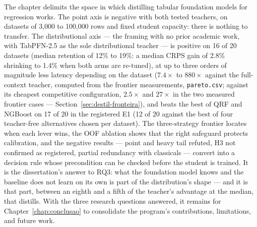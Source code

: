 The chapter delimits the space in which distilling tabular
foundation models for regression works. The point axis is negative
with both tested teachers, on datasets of 3{,}000 to 100{,}000 rows
and fixed student capacity: there is nothing to transfer. The
distributional axis --- the framing with no prior academic work,
with TabPFN-2.5 as the sole distributional teacher --- is positive
on 16 of 20 datasets (median retention of 12\% to 19\%: a median
CRPS gain of 2.8\% shrinking to 1.4\% when both arms are re-tuned),
at up to three orders of
magnitude less latency depending on the dataset ($7.4\times$ to
$880\times$ against the full-context teacher, computed from the
frontier measurements, \texttt{pareto.csv}; against its cheapest
competitive configuration, $2.5\times$ and $27\times$ in the two
measured frontier cases ---
Section~\ref{sec:destil-fronteira}), and
beats the best of QRF and NGBoost on 17 of 20 in the registered
E1 (12 of 20 against the best of four teacher-free alternatives
chosen per dataset).
The three-strategy frontier locates when each lever wins, the OOF
ablation shows that the right safeguard protects calibration, and
the negative results --- point and heavy tail refuted, H3 not
confirmed as registered,
partial redundancy with classicals --- convert into a decision rule
whose precondition can be checked before the student is trained.
It is the
dissertation's answer to RQ3: what the foundation model knows and
the baseline does not learn on its own is part of the
distribution's shape --- and it is that part, between an eighth and
a fifth of the teacher's advantage at the median, that distills.
With the three research questions answered, it remains for
Chapter~\ref{chap:conclusao} to consolidate the program's
contributions, limitations, and future work.
